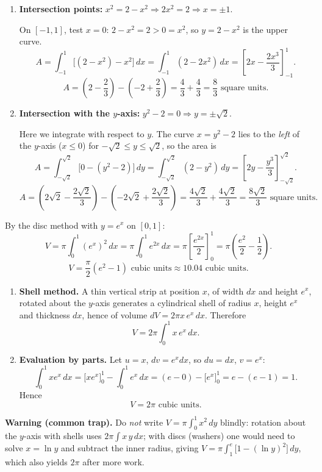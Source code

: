 \documentclass[11pt]{article}
\begin{document}
\begin{corrige}
\begin{enumerate}
\item \textbf{Intersection points:} $x^2 = 2 - x^2 \Rightarrow 2x^2 = 2 \Rightarrow x = \pm 1$.

On $[-1,1]$, test $x=0$: $2 - x^2 = 2 > 0 = x^2$, so $y = 2-x^2$ is the upper curve.
\[
A = \int_{-1}^{1}\big[(2-x^2) - x^2\big]\,dx = \int_{-1}^{1}(2 - 2x^2)\,dx = \left[2x - \frac{2x^3}{3}\right]_{-1}^{1}.
\]
\[
A = \left(2 - \frac{2}{3}\right) - \left(-2 + \frac{2}{3}\right) = \frac{4}{3} + \frac{4}{3} = \boxed{\frac{8}{3} \text{ square units}}.
\]

\item \textbf{Intersection with the $y$-axis:} $y^2 - 2 = 0 \Rightarrow y = \pm\sqrt{2}$.

Here we integrate with respect to $y$. The curve $x = y^2 - 2$ lies to the \emph{left} of the $y$-axis ($x \le 0$) for $-\sqrt2 \le y \le \sqrt2$, so the area is
\[
A = \int_{-\sqrt2}^{\sqrt2}\big[0 - (y^2 - 2)\big]\,dy = \int_{-\sqrt2}^{\sqrt2}(2 - y^2)\,dy = \left[2y - \frac{y^3}{3}\right]_{-\sqrt2}^{\sqrt2}.
\]
\[
A = \left(2\sqrt2 - \frac{2\sqrt2}{3}\right) - \left(-2\sqrt2 + \frac{2\sqrt2}{3}\right) = \frac{4\sqrt2}{3} + \frac{4\sqrt2}{3} = \boxed{\frac{8\sqrt2}{3} \text{ square units}}.
\]
\end{enumerate}
\end{corrige}

\begin{corrige}
By the disc method with $y = e^x$ on $[0,1]$:
\[
V = \pi\int_0^1 (e^x)^2\,dx = \pi\int_0^1 e^{2x}\,dx = \pi\left[\frac{e^{2x}}{2}\right]_0^1 = \pi\left(\frac{e^2}{2} - \frac{1}{2}\right).
\]
\[
\boxed{V = \frac{\pi}{2}\left(e^2 - 1\right) \text{ cubic units}} \approx 10.04 \text{ cubic units}.
\]
\end{corrige}

\begin{corrige}
\begin{enumerate}
\item \textbf{Shell method.} A thin vertical strip at position $x$, of width $dx$ and height $e^x$, rotated about the $y$-axis generates a cylindrical shell of radius $x$, height $e^x$ and thickness $dx$, hence of volume $dV = 2\pi x\, e^x\, dx$. Therefore
\[
V = 2\pi\int_0^1 x\,e^x\,dx .
\]
\item \textbf{Evaluation by parts.} Let $u = x$, $dv = e^x dx$, so $du = dx$, $v = e^x$:
\[
\int_0^1 x e^x\,dx = \Big[x e^x\Big]_0^1 - \int_0^1 e^x\,dx = (e - 0) - \Big[e^x\Big]_0^1 = e - (e - 1) = 1.
\]
Hence
\[
\boxed{V = 2\pi \text{ cubic units}}.
\]
\end{enumerate}

\textbf{Warning (common trap).} Do \emph{not} write $V = \pi\int_0^1 x^2\,dy$ blindly: rotation about the $y$-axis with shells uses $2\pi\int x\,y\,dx$; with discs (washers) one would need to solve $x = \ln y$ and subtract the inner radius, giving $V = \pi\int_1^e \big[1 - (\ln y)^2\big]\,dy$, which also yields $2\pi$ after more work.
\end{corrige}
\end{document}
